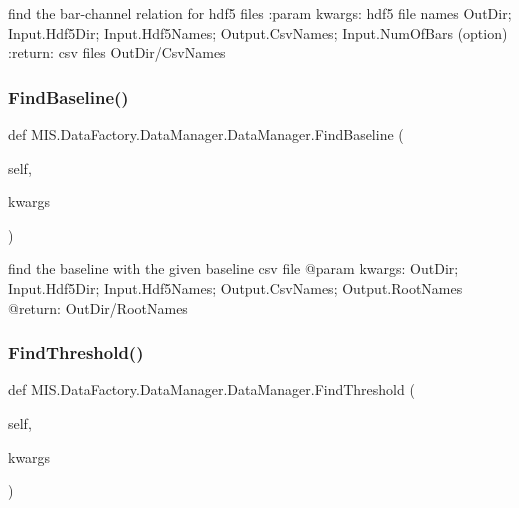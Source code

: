 \begin{DoxyVerb}find the bar-channel relation for hdf5 files
:param kwargs: hdf5 file names
OutDir; Input.Hdf5Dir; Input.Hdf5Names; Output.CsvNames; Input.NumOfBars (option)
:return: csv files
OutDir/CsvNames
\end{DoxyVerb}
 \mbox{\label{classMIS_1_1DataFactory_1_1DataManager_1_1DataManager_aa7b61ca8b7cb33b0786888c28456de36}} 
\subsubsection{\texorpdfstring{Find\+Baseline()}{FindBaseline()}}
{\footnotesize\ttfamily def M\+I\+S.\+Data\+Factory.\+Data\+Manager.\+Data\+Manager.\+Find\+Baseline (\begin{DoxyParamCaption}\item[{}]{self,  }\item[{}]{kwargs }\end{DoxyParamCaption})}

\begin{DoxyVerb}find the baseline with the given baseline csv file
@param kwargs: OutDir; Input.Hdf5Dir; Input.Hdf5Names; Output.CsvNames; Output.RootNames
@return: OutDir/RootNames
\end{DoxyVerb}
 \mbox{\label{classMIS_1_1DataFactory_1_1DataManager_1_1DataManager_ad17d5448bcc9b53d7fe26b24e0672147}} 
\subsubsection{\texorpdfstring{Find\+Threshold()}{FindThreshold()}}
{\footnotesize\ttfamily def M\+I\+S.\+Data\+Factory.\+Data\+Manager.\+Data\+Manager.\+Find\+Threshold (\begin{DoxyParamCaption}\item[{}]{self,  }\item[{}]{kwargs }\end{DoxyParamCaption})}

